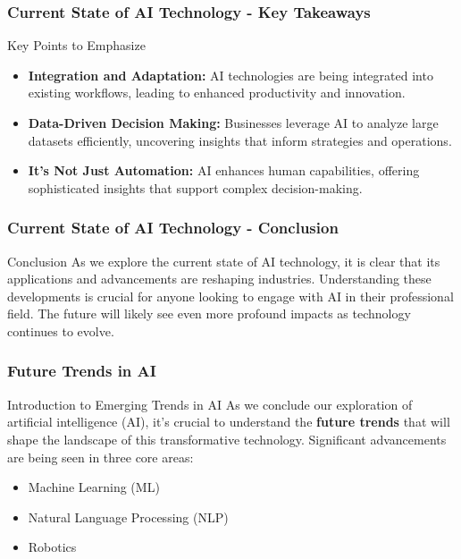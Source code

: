 \documentclass{beamer}
\begin{document}
\begin{frame}[fragile]
    \frametitle{Current State of AI Technology - Key Takeaways}
    \begin{block}{Key Points to Emphasize}
        \begin{itemize}
            \item \textbf{Integration and Adaptation:} AI technologies are being integrated into existing workflows, leading to enhanced productivity and innovation.
            \item \textbf{Data-Driven Decision Making:} Businesses leverage AI to analyze large datasets efficiently, uncovering insights that inform strategies and operations.
            \item \textbf{It's Not Just Automation:} AI enhances human capabilities, offering sophisticated insights that support complex decision-making.
        \end{itemize}
    \end{block}
\end{frame}

\begin{frame}[fragile]
    \frametitle{Current State of AI Technology - Conclusion}
    \begin{block}{Conclusion}
        As we explore the current state of AI technology, it is clear that its applications and advancements are reshaping industries. Understanding these developments is crucial for anyone looking to engage with AI in their professional field. The future will likely see even more profound impacts as technology continues to evolve.
    \end{block}
\end{frame}

\begin{frame}[fragile]
    \frametitle{Future Trends in AI}
    \begin{block}{Introduction to Emerging Trends in AI}
        As we conclude our exploration of artificial intelligence (AI), it's crucial to understand the \textbf{future trends} that will shape the landscape of this transformative technology. Significant advancements are being seen in three core areas:
    \end{block}
    \begin{itemize}
        \item Machine Learning (ML)
        \item Natural Language Processing (NLP)
        \item Robotics
    \end{itemize}
\end{frame}
\end{document}
